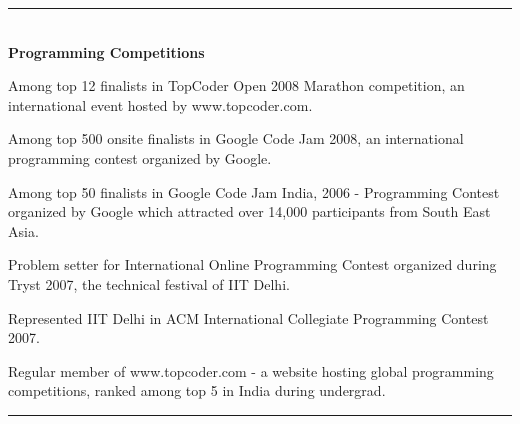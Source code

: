 \documentclass[11pt]{article}
\newenvironment{itemize*}%
  {\begin{itemize}%
    \setlength{\itemsep}{0pt}%
    \setlength{\parskip}{0pt}%
	}
  {\end{itemize}}
\begin{document}
\rule{6.5in}{2pt}
\\


{\large \textbf{Programming Competitions}}
\begin{itemize*}
	\item Among top 12 finalists in TopCoder Open 2008 Marathon competition, an international event hosted by www.topcoder.com. 
	\item Among top 500 onsite finalists in Google Code Jam 2008, an international programming contest organized by Google.
	\item Among top 50 finalists in Google Code Jam India, 2006 - Programming Contest organized by Google which attracted over 14,000 participants from South East Asia.
	\item Problem setter for International Online Programming Contest organized during Tryst 2007, the technical festival of IIT Delhi. 
	\item Represented IIT Delhi in ACM International Collegiate Programming Contest 2007. 
	\item Regular member of www.topcoder.com - a website hosting global programming competitions, ranked among top 5 in India during undergrad.
\end{itemize*}

\rule{6.5in}{2pt}
\end{document}
